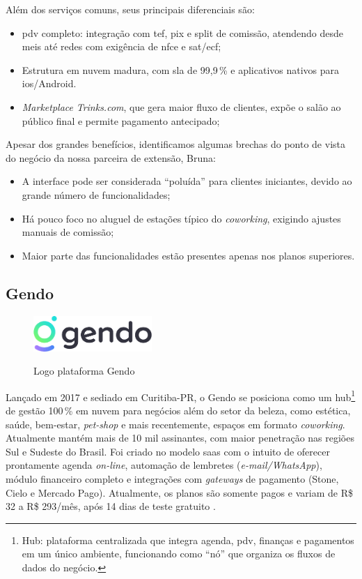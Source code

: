 Além dos serviços comuns, seus principais diferenciais são:

\begin{itemize}
	\item \gls{pdv} completo: integração com \gls{tef}, \gls{pix} e split de comissão, atendendo desde \gls{mei}s até redes com exigência de \gls{nfce} e \gls{sat}/\gls{ecf};
	\item Estrutura em nuvem madura, com \gls{sla} de 99,9\,\% e aplicativos nativos para \gls{ios}/Android.
	\item \emph{Marketplace} \textit{Trinks.com}, que gera maior fluxo de clientes, expõe o salão ao
	público final e permite pagamento antecipado;
\end{itemize}

Apesar dos grandes benefícios, identificamos algumas brechas do ponto de vista do negócio da nossa
parceira de extensão, Bruna:

\begin{itemize}
	\item A interface pode ser considerada “poluída” para clientes iniciantes, devido ao grande
	número de funcionalidades;
	\item Há pouco foco no aluguel de estações típico do \emph{coworking}, exigindo ajustes manuais de
	comissão;
	\item Maior parte das funcionalidades estão presentes apenas nos planos superiores.
\end{itemize}

\subsection{Gendo}

\begin{figure}[htb]
	\centering
	\caption{Logo plataforma Gendo}
	\includegraphics[width=0.4\textwidth]{cap01-Introducao/Images/1.4.2_Gendo}
	\label{fig:Gendo}
\end{figure}

 \FloatBarrier

Lançado em 2017 e sediado em Curitiba-PR, o Gendo se posiciona como um hub\footnote{Hub: plataforma centralizada que integra agenda, \gls{pdv}, finanças e pagamentos em um único ambiente, funcionando como “nó” que organiza os fluxos de dados do negócio.} de gestão 100\,\% em nuvem para negócios além do setor da beleza, como estética, saúde, bem-estar, \emph{pet-shop} e mais recentemente, espaços em formato \emph{coworking}. 
Atualmente mantém mais de 10 mil assinantes, com maior penetração nas regiões Sul e Sudeste do Brasil. Foi criado no modelo \gls{saas} com o intuito de oferecer prontamente agenda \emph{on-line}, automação de lembretes (\emph{e-mail/WhatsApp}), módulo financeiro completo e integrações com \emph{gateways} de pagamento (Stone, Cielo e Mercado Pago). Atualmente, os planos são somente pagos e variam de R\$ 32 a R\$ 293/mês, após 14 dias de teste gratuito \cite{Gendo}.

